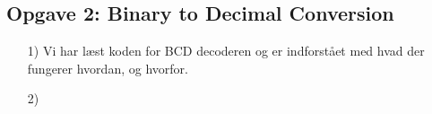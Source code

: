 \subsection{Opgave 2: Binary to Decimal Conversion}
\begin{enumerate}
	\item[1)]
	Vi har læst koden for BCD decoderen og er indforstået med hvad der fungerer hvordan, og hvorfor.
	
	\item[2)]
	
	
\end{enumerate}